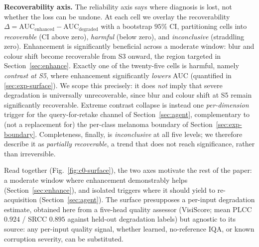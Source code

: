 \textbf{Recoverability axis.}
The reliability axis says where diagnosis is lost, not whether the loss can be undone. At each cell we overlay the recoverability $\Delta = \mathrm{AUC}_{\mathrm{enhanced}} - \mathrm{AUC}_{\mathrm{degraded}}$ with a bootstrap $95\%$ CI, partitioning cells into \emph{recoverable} (CI above zero), \emph{harmful} (below zero), and \emph{inconclusive} (straddling zero). Enhancement is significantly beneficial across a moderate window: blur and colour shift become recoverable from S3 onward, the region targeted in Section~\ref{sec:enhance}. Exactly one of the twenty-five cells is harmful, namely \emph{contrast at S5}, where enhancement significantly \emph{lowers} AUC (quantified in \cref{sec:exp-surface}). We scope this precisely: it does \emph{not} imply that severe degradation is universally unrecoverable, since blur and colour shift at S5 remain significantly recoverable. Extreme contrast collapse is instead one \emph{per-dimension} trigger for the query-for-retake channel of Section~\ref{sec:agent}, complementary to (not a replacement for) the per-class melanoma boundary of Section~\ref{sec:exp-boundary}. Completeness, finally, is \emph{inconclusive} at all five levels; we therefore describe it as \emph{partially recoverable}, a trend that does not reach significance, rather than irreversible.

Read together (Fig.~\ref{fig:c0-surface}), the two axes motivate the rest of the paper: a moderate window where enhancement demonstrably helps (Section~\ref{sec:enhance}), and isolated triggers where it should yield to re-acquisition (Section~\ref{sec:agent}). The surface presupposes a per-input degradation estimate, obtained here from a five-head quality assessor (VisiScore; mean PLCC $0.924$ / SRCC $0.895$ against held-out degradation labels) but agnostic to its source: any per-input quality signal, whether learned, no-reference IQA, or known corruption severity, can be substituted.



